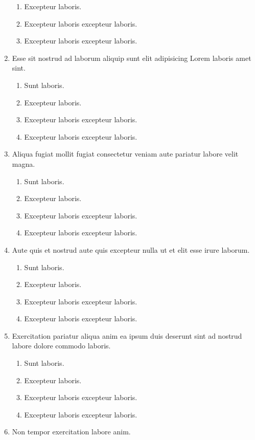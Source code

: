 \documentclass[a4paper,12pt]{article}
\begin{document}
\begin{enumerate}[label=\textbf{\arabic*.}]
\begin{enumerate}
    \item Excepteur laboris.
    \item Excepteur laboris excepteur laboris.
    \item Excepteur laboris excepteur laboris.
  \end{enumerate}
  \item Esse sit nostrud ad laborum aliquip sunt elit adipisicing Lorem laboris amet sint.
  \begin{enumerate}
    \item Sunt laboris.
    \item Excepteur laboris.
    \item Excepteur laboris excepteur laboris.
    \item Excepteur laboris excepteur laboris.
  \end{enumerate}
  \item Aliqua fugiat mollit fugiat consectetur veniam aute pariatur labore velit magna.
  \begin{enumerate}
    \item Sunt laboris.
    \item Excepteur laboris.
    \item Excepteur laboris excepteur laboris.
    \item Excepteur laboris excepteur laboris.
  \end{enumerate}
  \item Aute quis et nostrud aute quis excepteur nulla ut et elit esse irure laborum.
  \begin{enumerate}
    \item Sunt laboris.
    \item Excepteur laboris.
    \item Excepteur laboris excepteur laboris.
    \item Excepteur laboris excepteur laboris.
  \end{enumerate}
  \item Exercitation pariatur aliqua anim ea ipsum duis deserunt sint ad nostrud labore dolore commodo laboris.
  \begin{enumerate}
    \item Sunt laboris.
    \item Excepteur laboris.
    \item Excepteur laboris excepteur laboris.
    \item Excepteur laboris excepteur laboris.
  \end{enumerate}
  \item Non tempor exercitation labore anim.

\end{enumerate}
\end{document}
